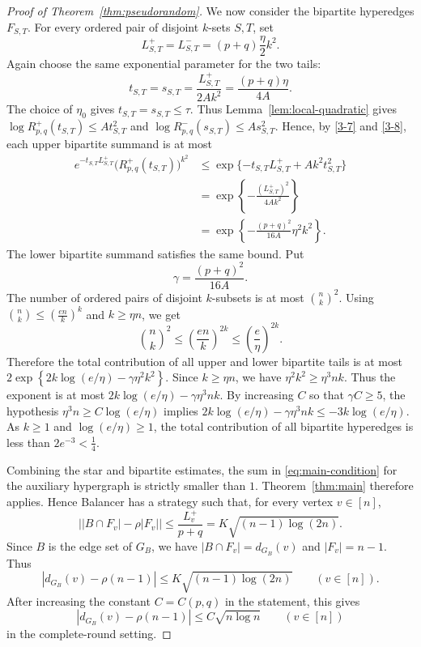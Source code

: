 \documentclass[twoside,12pt]{article}
\numberwithin{equation}{section}
\begin{document}
\begin{proof}[Proof of Theorem~\ref{thm:pseudorandom}]
We now consider the bipartite hyperedges $F_{S,T}$.  For every ordered pair
of disjoint $k$-sets $S,T$, set
\begin{equation}\label{3-7}
L_{S,T}^+=L_{S,T}^-=(p+q)\frac{\eta}{2}k^2.
\end{equation}
Again choose the same exponential parameter for the two tails:
\begin{equation}\label{3-8}
t_{S,T}=s_{S,T}
        =
        \frac{L_{S,T}^+}{2A k^2}
        =
        \frac{(p+q)\eta}{4A}.
\end{equation}
The choice of $\eta_0$ gives
$t_{S,T}=s_{S,T}\le\tau$.
Thus Lemma~\ref{lem:local-quadratic} gives
$\log R^+_{p,q}(t_{S,T})\le A t_{S,T}^2$
and $\log R^-_{p,q}(s_{S,T})\le A s_{S,T}^2$.
Hence, by \eqref{3-7} and \eqref{3-8}, each upper bipartite summand is at most
\[
\begin{aligned}
        e^{-t_{S,T}L_{S,T}^+}
        \bigl(R^+_{p,q}(t_{S,T})\bigr)^{k^2}
        &\le
        \exp\{-t_{S,T}L_{S,T}^+ + A k^2t_{S,T}^2\}  \\
        &=
        \exp\left\{
        -\frac{(L_{S,T}^+)^2}{4Ak^2}
        \right\}  \\
        &=
        \exp\left\{
        -\frac{(p+q)^2}{16A}\eta^2k^2
        \right\}.
\end{aligned}
\]
The lower bipartite summand satisfies the same bound.  Put
\[
        \gamma=\frac{(p+q)^2}{16A}.
\]
The number of ordered pairs of disjoint $k$-subsets is at most
$\binom nk^2$.
Using
$\binom nk\le \left(\frac{en}{k}\right)^k$
and $k\ge \eta n$,
we get
\[
        \binom nk^2
        \le
        \left(\frac{en}{k}\right)^{2k}
        \le
        \left(\frac e\eta\right)^{2k}.
\]
Therefore the total contribution of all upper and lower bipartite tails is at most
$2\exp\left\{
        2k\log(e/\eta)-\gamma\eta^2k^2
        \right\}$.
Since $k\ge\eta n$, we have
$\eta^2k^2\ge \eta^3nk$.
Thus the exponent is at most
$2k\log(e/\eta)-\gamma\eta^3nk$.
By increasing $C$ so that
$\gamma C\ge5$,
the hypothesis
$ \eta^3 n\ge C\log(e/\eta)$
implies
$2k\log(e/\eta)-\gamma\eta^3nk
        \le
        -3k\log(e/\eta)$.
As $k\ge1$ and $\log(e/\eta)\ge1$, the total contribution of all bipartite
hyperedges is less than
$2e^{-3}<\frac14$.

Combining the star and bipartite estimates, the sum in \eqref{eq:main-condition}
for the auxiliary hypergraph is strictly smaller than $1$.  Theorem~\ref{thm:main}
therefore applies.  Hence Balancer has a strategy such that, for every vertex
$v\in[n]$,
\[
        \left|
        |B\cap F_v|-\rho |F_v|
        \right|
        \le
        \frac{L_v^+}{p+q}
        =
        K\sqrt{(n-1)\log(2n)}.
\]
Since $B$ is the edge set of $G_B$, we have
$|B\cap F_v|=d_{G_B}(v)$
and
$|F_v|=n-1$.
Thus
\[
        \left|
        d_{G_B}(v)-\rho(n-1)
        \right|
        \le
        K\sqrt{(n-1)\log(2n)}
        \qquad(v\in[n]).
\]
After increasing the constant $C=C(p,q)$ in the statement, this gives
\[
        \left|
        d_{G_B}(v)-\rho(n-1)
        \right|
        \le
        C\sqrt{n\log n}
        \qquad(v\in[n])
\]
in the complete-round setting.


\end{proof}
\end{document}
